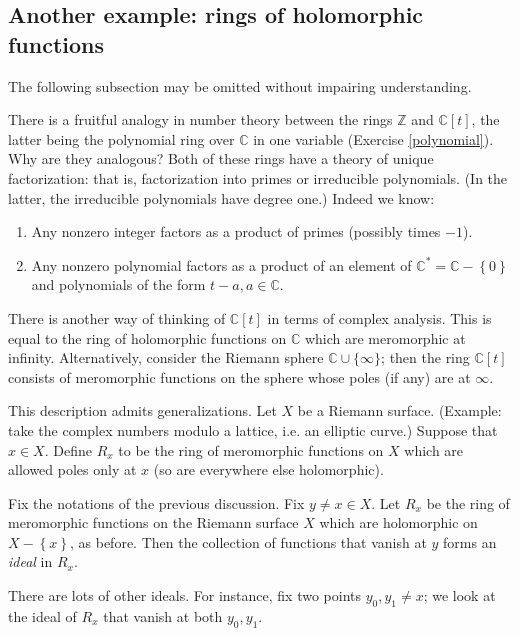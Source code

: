 \subsection{Another example: rings of holomorphic functions}

The following subsection may be omitted without impairing understanding.

There is a fruitful analogy in number theory between the rings $\mathbb{Z}$ and
$\mathbb{C}[t]$, the latter being the polynomial ring over $\mathbb{C}$ in one
variable (Exercise \ref{polynomial}). Why are they analogous? Both of these
rings have a theory of unique factorization: that is, factorization into primes
or irreducible polynomials. (In the latter, the irreducible polynomials have
degree one.) Indeed we know:

\begin{enumerate}
  \item Any nonzero integer factors as a product of primes (possibly times
        $-1$).
  \item Any nonzero polynomial factors as a product of an element of
        $\mathbb{C}^* =\mathbb{C} - \left\{0\right\}$ and polynomials of the
        form $t - a, a \in \mathbb{C}$.
\end{enumerate}

There is another way of thinking of $\mathbb{C}[t]$ in terms of complex
analysis. This is equal to the ring of holomorphic functions on $\mathbb{C}$
which are meromorphic at infinity. Alternatively, consider the Riemann sphere
$\mathbb{C} \cup \{ \infty\}$; then the ring $\mathbb{C}[t]$ consists of
meromorphic functions on the sphere whose poles (if any) are at $\infty$.

This description admits generalizations. Let $X$ be a Riemann surface.
(Example: take the complex numbers modulo a lattice, i.e. an elliptic curve.)
Suppose that $x \in X$. Define $R_x$ to be the ring of meromorphic functions on
$X$ which are allowed poles only at $x$ (so are everywhere else holomorphic).

\begin{example}
Fix the notations of the previous discussion. Fix $y \neq x \in X$. Let $R_x$
be the ring of meromorphic functions on the Riemann surface $X$ which are
holomorphic on $X - \left\{x\right\}$, as before. Then the collection of
functions that vanish at $y$ forms an \emph{ideal} in $R_x$.

There are lots of other ideals. For instance, fix two points $y_0, y_1 \neq x$;
we look at the ideal of $R_x$ that vanish at both $y_0, y_1$.
\end{example}

